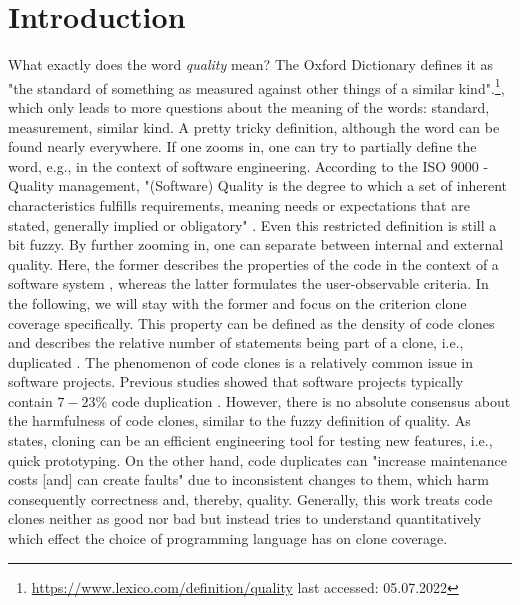 
\section{Introduction}
\label{sec:intro}

What exactly does the word \textit{quality} mean? The Oxford Dictionary defines it as "the standard of something as measured against other things of a similar kind".\footnote{\url{https://www.lexico.com/definition/quality} last accessed: 05.07.2022}, which only leads to more questions about the meaning of the words: standard, measurement, similar kind. A pretty tricky definition, although the word can be found nearly everywhere.
If one zooms in, one can try to partially define the word, e.g., in the context of software engineering. According to the ISO 9000 - Quality management, "(Software) Quality is the degree to which a set of inherent characteristics fulfills requirements, meaning needs or expectations that are stated, generally implied or obligatory" \cite{matthes2020ase}.
Even this restricted definition is still a bit fuzzy. By further zooming in, one can separate between internal and external quality. Here, the former describes the properties of the code in the context of a software system \cite{pretschner2022requirements}, whereas the latter formulates the user-observable criteria.
In the following, we will stay with the former and focus on the criterion clone coverage specifically.
This property can be defined as the density of code clones and describes the relative number of statements being part of a clone, i.e., duplicated \cite{knilling2020priorisierung}.
The phenomenon of code clones is a relatively common issue in software projects. Previous studies showed that software projects typically contain $7 -23\%$ code duplication \cite{koschke2007survey}.
However, there is no absolute consensus about the harmfulness of code clones, similar to the fuzzy definition of quality. As \cite{kasper2006cloning} states, cloning can be an efficient engineering tool for testing new features, i.e., quick prototyping.
On the other hand, code duplicates can "increase maintenance costs [and] can create faults" \cite{juergens2009code} due to inconsistent changes to them, which harm consequently correctness and, thereby, quality. Generally, this work treats code clones neither as good nor bad but instead tries to understand quantitatively which effect the choice of programming language has on clone coverage.
